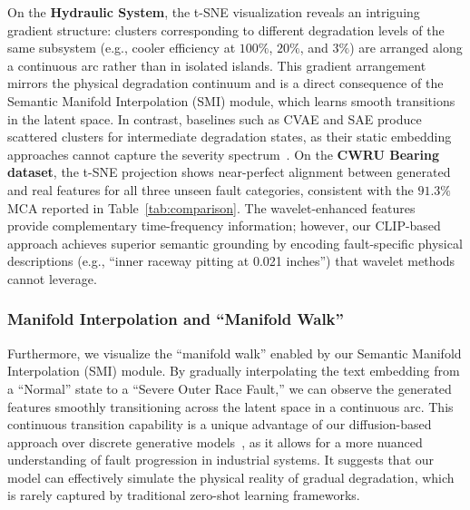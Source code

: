 On the \textbf{Hydraulic System}, the t-SNE visualization reveals an intriguing gradient structure: clusters corresponding to different degradation levels of the same subsystem (e.g., cooler efficiency at $100\%$, $20\%$, and $3\%$) are arranged along a continuous arc rather than in isolated islands. This gradient arrangement mirrors the physical degradation continuum and is a direct consequence of the Semantic Manifold Interpolation (SMI) module, which learns smooth transitions in the latent space. In contrast, baselines such as CVAE and SAE produce scattered clusters for intermediate degradation states, as their static embedding approaches cannot capture the severity spectrum~\cite{song2025generalized}. On the \textbf{CWRU Bearing dataset}, the t-SNE projection shows near-perfect alignment between generated and real features for all three unseen fault categories, consistent with the $91.3\%$ MCA reported in Table~\ref{tab:comparison}. The wavelet-enhanced features~\cite{li2022wavelet} provide complementary time-frequency information; however, our CLIP-based approach achieves superior semantic grounding by encoding fault-specific physical descriptions (e.g., ``inner raceway pitting at 0.021 inches'') that wavelet methods cannot leverage.

\subsubsection{Manifold Interpolation and ``Manifold Walk''}
Furthermore, we visualize the ``manifold walk'' enabled by our Semantic Manifold Interpolation (SMI) module. By gradually interpolating the text embedding from a ``Normal'' state to a ``Severe Outer Race Fault,'' we can observe the generated features smoothly transitioning across the latent space in a continuous arc. This continuous transition capability is a unique advantage of our diffusion-based approach over discrete generative models~\cite{xian2019zero}, as it allows for a more nuanced understanding of fault progression in industrial systems. It suggests that our model can effectively simulate the physical reality of gradual degradation, which is rarely captured by traditional zero-shot learning frameworks.

